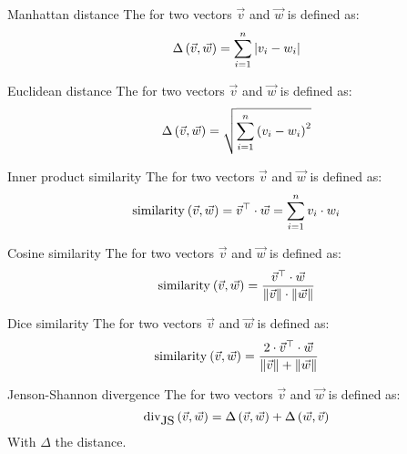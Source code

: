 \begin{df}{Manhattan distance}
The \sb{} for two vectors $\vec{v}$ and $\vec{w}$ is defined as:
\begin{equation}
\fun{\Delta}{\vec{v},\vec{w}}=\displaystyle\sum_{i=1}^{n}{\abs{v_i-w_i}}
\end{equation}
\end{df}
\begin{df}{Euclidean distance}
The \sb{} for two vectors $\vec{v}$ and $\vec{w}$ is defined as:
\begin{equation}
\fun{\Delta}{\vec{v},\vec{w}}=\sqrt{\displaystyle\sum_{i=1}^{n}{\brak{v_i-w_i}^2}}
\end{equation}
\end{df}
\begin{df}{Inner product similarity}
The \sb{} for two vectors $\vec{v}$ and $\vec{w}$ is defined as:
\begin{equation}
\funm{similarity}{\vec{v},\vec{w}}=\transpose{\vec{v}}\cdot\vec{w}=\displaystyle\sum_{i=1}^{n}{v_i\cdot w_i}
\end{equation}
\end{df}
\begin{df}{Cosine similarity}
The \sb{} for two vectors $\vec{v}$ and $\vec{w}$ is defined as:
\begin{equation}
\funm{similarity}{\vec{v},\vec{w}}=\displaystyle\frac{\transpose{\vec{v}}\cdot\vec{w}}{\dabs{\vec{v}}\cdot\dabs{\vec{w}}}
\end{equation}
\end{df}
\begin{df}{Dice similarity}
The \sb{} for two vectors $\vec{v}$ and $\vec{w}$ is defined as:
\begin{equation}
\funm{similarity}{\vec{v},\vec{w}}=\displaystyle\frac{2\cdot\transpose{\vec{v}}\cdot\vec{w}}{\dabs{\vec{v}}+\dabs{\vec{w}}}
\end{equation}
\end{df}
\begin{df}{Jenson-Shannon divergence}
The \sb{} for two vectors $\vec{v}$ and $\vec{w}$ is defined as:
\begin{equation}
\funm[\mbox{JS}]{div}{\vec{v},\vec{w}}=\fun{\Delta}{\vec{v},\vec{w}}+\fun{\Delta}{\vec{w},\vec{v}}
\end{equation}
With $\Delta$ the  distance.
\end{df}